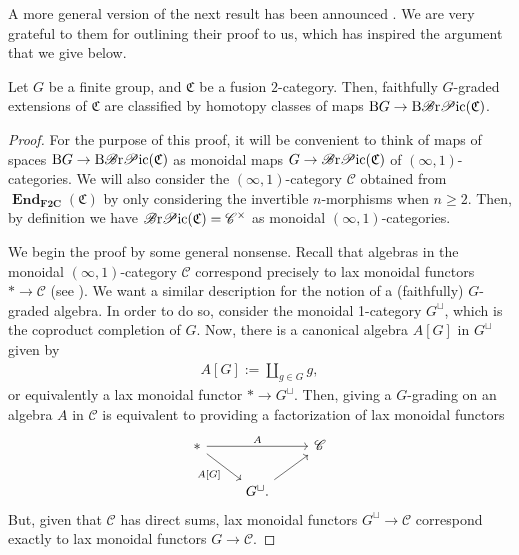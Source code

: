 A more general version of the next result has been announced \cite{JFR3}. We are very grateful to them for outlining their proof to us, which has inspired the argument that we give below.

\begin{Theorem}\label{thm:extensiontheory}
Let $G$ be a finite group, and $\mathfrak{C}$ be a fusion $2$-category. Then, faithfully $G$-graded extensions of $\mathfrak{C}$ are classified by homotopy classes of maps $\mathrm{B}G\rightarrow \mathrm{B}\mathscr{B}{\rm r}\mathscr{P}{\rm ic}(\mathfrak{C})$.
\end{Theorem}
\begin{proof}
For the purpose of this proof, it will be convenient to think of maps of spaces $\mathrm{B}G\rightarrow \mathrm{B}\mathscr{B}{\rm r}\mathscr{P}{\rm ic}(\mathfrak{C})$ as monoidal maps $G\rightarrow \mathscr{B}{\rm r}\mathscr{P}{\rm ic}(\mathfrak{C})$ of $(\infty,1)$-categories. We will also consider the $(\infty,1)$-category $\mathscr{C}$ obtained from $\mathbf{\operatorname{End}}_{\mathbf{F2C}}(\mathfrak{C})$ by only considering the invertible $n$-morphisms when $n\geq 2$. Then, by definition we have $\mathscr{B}{\rm r}\mathscr{P}{\rm ic}(\mathfrak{C})=\mathscr{C}^{\times}$ as monoidal $(\infty,1)$-categories.

We begin the proof by some general nonsense. Recall that algebras in the monoidal $(\infty,1)$-category $\mathscr{C}$ correspond precisely to lax monoidal functors $*\rightarrow \mathscr{C}$ (see \cite[Example~2.2.6.10]{L2}). We want a similar description for the notion of a (faithfully) $G$-graded algebra. In order to do so, consider the monoidal 1-category $G^{\sqcup}$, which is the coproduct completion of $G$. Now, there is a canonical algebra $A[G]$ in $G^{\sqcup}$ given by
 \begin{gather*}
A[G]:=\coprod_{g\in G}g,
\end{gather*}
 or equivalently a lax monoidal functor $*\rightarrow G^{\sqcup}$. Then, giving a $G$-grading on an algebra $A$ in $\mathscr{C}$ is equivalent to providing a factorization of lax monoidal functors
\begin{displaymath}
\begin{tikzcd}
* \arrow[rr,"A"] \arrow[rd, "A\lbrack G \rbrack"'] & & \mathscr{C} \\
 & G^{\sqcup}. \arrow[ru] &
\end{tikzcd}\end{displaymath}
But, given that $\mathscr{C}$ has direct sums, lax monoidal functors $G^{\sqcup}\rightarrow \mathscr{C}$ correspond exactly to lax monoidal functors $G\rightarrow \mathscr{C}$.


\end{proof}

